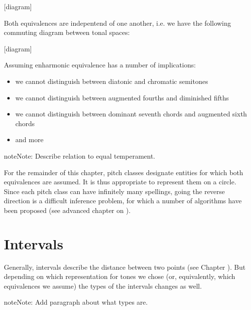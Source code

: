 \documentclass[letterpaper,10pt,english]{sphinxmanual}
\begin{document}
\sphinxAtStartPar
{[}diagram{]}

\sphinxAtStartPar
Both equivalences are indepentend of one another, i.e. we have the following commuting diagram between tonal spaces:

\sphinxAtStartPar
{[}diagram{]}

\sphinxAtStartPar
Assuming enharmonic equivalence has a number of implications:
\begin{itemize}
\item {} 
\sphinxAtStartPar
we cannot distinguish between diatonic and chromatic semitones

\item {} 
\sphinxAtStartPar
we cannot distinguish between augmented fourths and diminished fifths

\item {} 
\sphinxAtStartPar
we cannot distinguish between dominant seventh chords and augmented sixth chords

\item {} 
\sphinxAtStartPar
and more

\end{itemize}

\begin{sphinxadmonition}{note}{Note:}
\sphinxAtStartPar
Describe relation to equal temperament.
\end{sphinxadmonition}

\sphinxAtStartPar
For the remainder of this chapter, pitch classes designate entities for which both equivalences are assumed.
It is thus appropriate to represent them on a circle. Since each pitch class can have infinitely many spellings,
going the reverse direction is a difficult inference problem, for which a number of algorithms have been proposed
(see advanced chapter on {\hyperref[\detokenize{6_advanced:pitch-spelling}]{}}).


\section{Intervals}
\label{\detokenize{3_set_theory:intervals}}
\sphinxAtStartPar
Generally, intervals describe the distance between two points (see Chapter {\hyperref[\detokenize{1_fundamentals:intervals}]{}}).
But depending on which representation for tones we chose (or, equivalently, which equivalences we assume)
the types of the intervals changes as well.

\begin{sphinxadmonition}{note}{Note:}
\sphinxAtStartPar
Add paragraph about what types are.
\end{sphinxadmonition}
\end{document}
